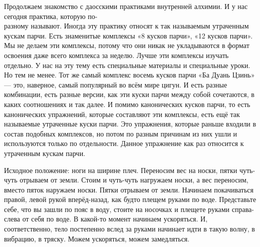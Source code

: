 Продолжаем знакомство с даосскими практиками внутренней
алхимии. И у нас сегодня практика, которую по-\\разному называют. Иногда эту практику относят к
так называемым утраченным кускам парчи. Есть знаменитые комплексы «8 кусков парчи», «12 кусков
парчи». Мы не делаем эти комплексы, потому что они никак не укладываются
в формат освоения даже всего комплекса за неделю. Лучше эти комплексы
изучать отдельно. У нас на эту тему есть специальные материалы и специальные уроки. Но тем не
менее. Тот же самый комплекс восемь кусков парчи «Ба Дуань Цзинь» --- это, наверное, самый
популярный во всём мире цигун. И есть разные комбинации, есть разные версии, как эти куски
парчи между собой сочетаются, в каких соотношениях и так далее. И помимо канонических кусков
парчи, то есть канонических упражнений, которые составляют эти комплексы, есть ещё так
называемые утраченные куски парчи. Это упражнения, которые раньше входили в состав подобных
комплексов, но потом по разным причинам из них ушли и используются только по отдельности.
Данное упражнение как раз относится к утраченным кускам парчи.

Исходное
положение: ноги на ширине плеч. Переносим вес на носки, пятки чуть-чуть отрываем от земли.
Стоим и чуть-чуть нагружаем носки, а вес переносим, вместо пяток наружаем носки. Пятки отрываем от
земли. Начинаем покачиваться правой, левой рукой вперёд-назад, как будто плещем руками по воде.
Представьте себе, что вы зашли по пояс в воду, стоите на носочках и плещете руками справа-слева
от себя по воде. В какой-то момент начинаем ускоряться. И, соответственно, тело постепенно вслед
за руками начинает идти в такую волну, в вибрацию, в тряску. Можем ускоряться, можем
замедляться.


